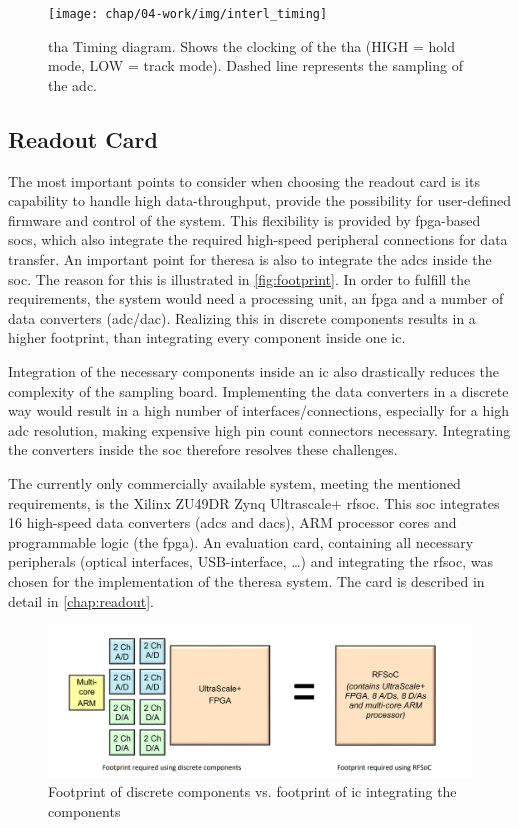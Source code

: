 \begin{figure}
	\centering
	\tikzexternaldisable
	\texttt{[image: chap/04-work/img/interl\_timing]}
	\tikzexternalenable
	\caption[Track-And-Hold Timing diagram]{\gls{tha} Timing diagram. Shows the clocking of the \gls{tha} (HIGH = hold mode, LOW = track mode). Dashed line represents the sampling of the \gls{adc}.}
	\label{fig:THA}
\end{figure}

 
\subsection{Readout Card}
The most important points to consider when choosing the readout card is its capability to handle high data-throughput, provide the possibility for user-defined firmware and control of the system.
This flexibility is provided by \gls{fpga}-based \glspl{soc}, which also integrate the required high-speed peripheral connections for data transfer.
An important point for \gls{theresa} is also to integrate the \glspl{adc} inside the \gls{soc}. 
The reason for this is illustrated in \autoref{fig:footprint}. 
In order to fulfill the requirements, the system would need a processing unit, an \gls{fpga} and a number of data converters (\gls{adc}/\gls{dac}).
Realizing this in discrete components results in a higher footprint, than integrating every component inside one \gls{ic}.

Integration of the necessary components inside an \gls{ic} also drastically reduces the complexity of the sampling board.
Implementing the data converters in a discrete way would result in a high number of interfaces/connections, especially for a high \gls{adc} resolution,  making expensive high pin count connectors necessary.
Integrating the converters inside the \gls{soc} therefore resolves these challenges.

The currently only commercially available system, meeting the mentioned requirements, is the Xilinx ZU49DR Zynq Ultrascale+ \gls{rfsoc}.
This \gls{soc} integrates 16 high-speed data converters (\glspl{adc} and \glspl{dac}), ARM processor cores and programmable logic (the \gls{fpga}).
An evaluation card, containing all necessary peripherals (optical interfaces, USB-interface, \dots) and integrating the \gls{rfsoc}, was chosen for the implementation of the \gls{theresa} system.
The card is described in detail in \autoref{chap:readout}.

\begin{figure}[tbh]
	\centering
	\includegraphics[width = \textwidth]{chap/04-work/img/footprint}
	\caption[Discrete components vs. IC]{Footprint of discrete components vs. footprint of \gls{ic} integrating the components}
	\label{fig:footprint}
\end{figure}

